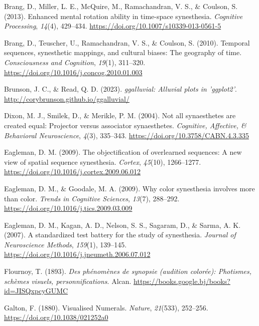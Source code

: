 \documentclass[
  man,
  longtable,
  a4paper,
  nolmodern,
  notxfonts,
  notimes,
  colorlinks=true,linkcolor=blue,citecolor=blue,urlcolor=blue]{apa7}
\newlength{\cslhangindent}
\newenvironment{CSLReferences}[2] %
 {\begin{list}{}{%
  \setlength{\itemindent}{0pt}
  \setlength{\leftmargin}{0pt}
  \setlength{\parsep}{0pt}
  \ifodd #1
   \setlength{\leftmargin}{\cslhangindent}
   \setlength{\itemindent}{-1\cslhangindent}
  \fi
  \setlength{\itemsep}{#2\baselineskip}}}
 {\end{list}}
\begin{document}
\label{refs}
\begin{CSLReferences}{1}{0}
Brang, D., Miller, L. E., McQuire, M., Ramachandran, V. S., \& Coulson,
S. (2013). Enhanced mental rotation ability in time-space synesthesia.
\emph{Cognitive Processing}, \emph{14}(4), 429--434.
\url{https://doi.org/10.1007/s10339-013-0561-5}

Brang, D., Teuscher, U., Ramachandran, V. S., \& Coulson, S. (2010).
Temporal sequences, synesthetic mappings, and cultural biases: The
geography of time. \emph{Consciousness and Cognition}, \emph{19}(1),
311--320. \url{https://doi.org/10.1016/j.concog.2010.01.003}

Brunson, J. C., \& Read, Q. D. (2023). \emph{{ggalluvial}: Alluvial
plots in 'ggplot2'}. \url{http://corybrunson.github.io/ggalluvial/}

Dixon, M. J., Smilek, D., \& Merikle, P. M. (2004). Not all synaesthetes
are created equal: Projector versus associator synaesthetes.
\emph{Cognitive, Affective, \& Behavioral Neuroscience}, \emph{4}(3),
335--343. \url{https://doi.org/10.3758/CABN.4.3.335}

Eagleman, D. M. (2009). The objectification of overlearned sequences: A
new view of spatial sequence synesthesia. \emph{Cortex}, \emph{45}(10),
1266--1277. \url{https://doi.org/10.1016/j.cortex.2009.06.012}

Eagleman, D. M., \& Goodale, M. A. (2009). Why color synesthesia
involves more than color. \emph{Trends in Cognitive Sciences},
\emph{13}(7), 288--292. \url{https://doi.org/10.1016/j.tics.2009.03.009}

Eagleman, D. M., Kagan, A. D., Nelson, S. S., Sagaram, D., \& Sarma, A.
K. (2007). A standardized test battery for the study of synesthesia.
\emph{Journal of Neuroscience Methods}, \emph{159}(1), 139--145.
\url{https://doi.org/10.1016/j.jneumeth.2006.07.012}

Flournoy, T. (1893). \emph{Des phénomènes de synopsie (audition
colorée): Photismes, schèmes visuels, personnifications}. Alcan.
\url{https://books.google.bj/books?id=JISQxpcyGUMC}

Galton, F. (1880). Visualised Numerals. \emph{Nature}, \emph{21}(533),
252--256. \url{https://doi.org/10.1038/021252a0}


\end{CSLReferences}
\end{document}
